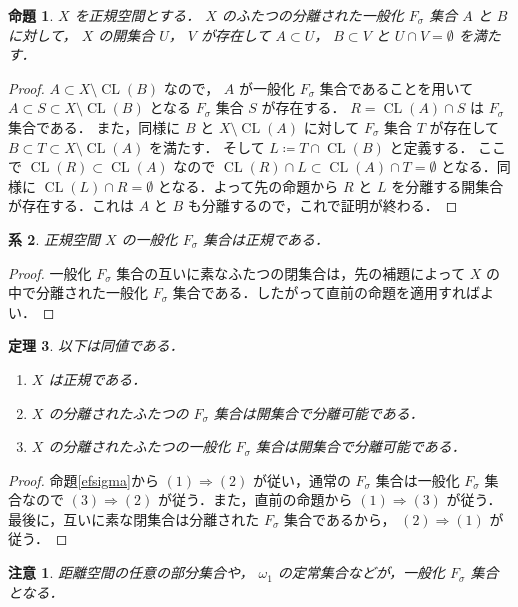 \documentclass[leqno, 12pt]{ltjsarticle}
\newtheorem{thm}{定理}
\newtheorem{prop}[thm]{命題}
\newtheorem{cor}[thm]{系}
\newtheorem*{rmk}{注意}
\newcommand{\To}{\Longrightarrow}
\newcommand{\omegaone}{\omega_{1}}
\DeclareMathOperator{\cl}{CL}
\begin{document}
\begin{prop}
$X$
を正規空間とする．
$X$
のふたつの分離された一般化
$F_{\sigma}$
集合
$A$
と
$B$
に対して，
$X$
の開集合
$U$，
$V$
が存在して
$A\subset U$，
$B\subset V$
と
$U\cap V=\emptyset$
を満たす．
\end{prop}
\begin{proof}
$A\subset X\setminus \cl(B)$
なので，
$A$
が一般化
$F_{\sigma}$
集合であることを用いて
$A\subset S\subset X\setminus \cl(B)$
となる
$F_{\sigma}$
集合
$S$
が存在する．
$R=\cl(A)\cap S$
は
$F_{\sigma}$
集合である．
また，同様に
$B$
と
$X\setminus \cl(A)$
に対して
$F_{\sigma}$
集合
$T$
が存在して
$B\subset T\subset X\setminus \cl(A)$
を満たす．
そして
$L\coloneqq T\cap \cl(B)$
と定義する．
ここで
$\cl(R)\subset \cl(A)$
なので
$\cl(R)\cap L\subset \cl(A)\cap T=\emptyset$
となる．同様に
$\cl(L)\cap R=\emptyset$
となる．よって先の命題から
$R$
と
$L$
を分離する開集合が存在する．これは
$A$
と
$B$
も分離するので，これで証明が終わる．
\end{proof}

\begin{cor}\label{cor:gfs}
正規空間
$X$
の一般化
$F_{\sigma}$
集合は正規である．
\end{cor}
\begin{proof}
一般化
$F_{\sigma}$
集合の互いに素なふたつの閉集合は，先の補題によって
$X$
の中で分離された一般化
$F_{\sigma}$
集合である．したがって直前の命題を適用すればよい．
\end{proof}

\begin{thm}
以下は同値である．
\begin{enumerate}[label=\textup{(\arabic*)}]
\item
$X$
は正規である．
\item
$X$
の分離されたふたつの
$F_{\sigma}$
集合は開集合で分離可能である．
\item
$X$
の分離されたふたつの一般化
$F_{\sigma}$
集合は開集合で分離可能である．
\end{enumerate}
\end{thm}
\begin{proof}
命題\ref{efsigma}から
$(1)\To(2)$
が従い，通常の
$F_{\sigma}$
集合は一般化
$F_{\sigma}$
集合なので
$(3)\To(2)$
が従う．また，直前の命題から
$(1)\To(3)$
が従う．最後に，互いに素な閉集合は分離された
$F_{\sigma}$
集合であるから，
$(2)\To(1)$
が従う．
\end{proof}



\begin{rmk}
距離空間の任意の部分集合や，
$\omegaone$
の定常集合などが，一般化
$F_{\sigma}$
集合となる．
\end{rmk}
\end{document}
